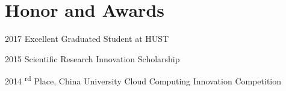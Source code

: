 \documentclass[12pt,letterpaper]{report}
\begin{document}
%		
%		
%		
%		
%		
%		
%	


\section*{Honor and Awards}

\begin{tablist}
	\item[2017] \tab Excellent Graduated Student at HUST
	\item[2015] \tab Scientific Research Innovation Scholarship
	\item[2014] \textsuperscript{rd} Place, China University Cloud Computing Innovation Competition
\end{tablist}
\end{document}
